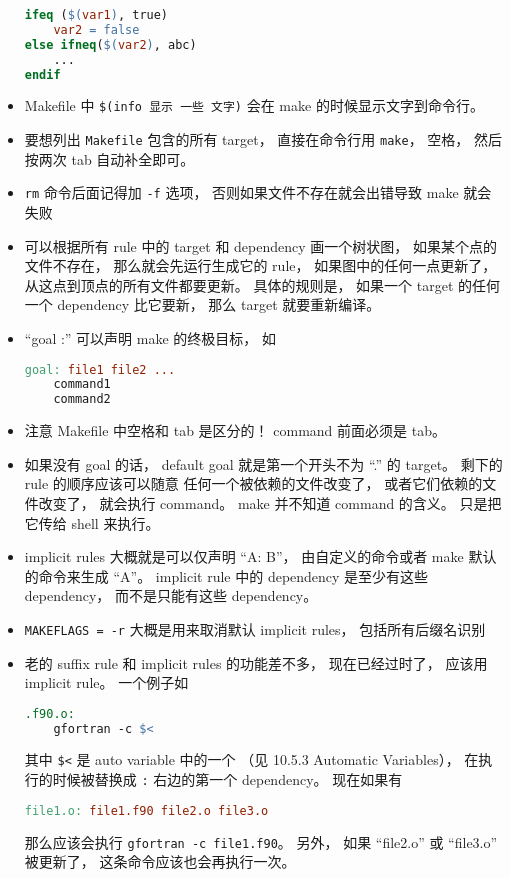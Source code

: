 \begin{itemize}
\begin{lstlisting}[language=makefile]
ifeq ($(var1), true)
    var2 = false
else ifneq($(var2), abc)
    ...
endif
\end{lstlisting}
\item Makefile 中 \verb|$(info 显示 一些 文字)| 会在 make 的时候显示文字到命令行。
\item 要想列出 \verb|Makefile| 包含的所有 target， 直接在命令行用 \verb|make|， 空格， 然后按两次 tab 自动补全即可。
\item \verb|rm| 命令后面记得加 \verb|-f| 选项， 否则如果文件不存在就会出错导致 make 就会失败
\item 可以根据所有 rule 中的 target 和 dependency 画一个树状图， 如果某个点的文件不存在， 那么就会先运行生成它的 rule， 如果图中的任何一点更新了， 从这点到顶点的所有文件都要更新。 具体的规则是， 如果一个 target 的任何一个 dependency 比它要新， 那么 target 就要重新编译。
\item “goal :” 可以声明 make 的终极目标， 如
\begin{lstlisting}[language=makefile]
goal: file1 file2 ...
	command1
	command2
\end{lstlisting}
\item 注意 Makefile 中空格和 tab 是区分的！ command 前面必须是 tab。
\item 如果没有 goal 的话， default goal 就是第一个开头不为 “.” 的 target。 剩下的 rule 的顺序应该可以随意
任何一个被依赖的文件改变了， 或者它们依赖的文件改变了， 就会执行 command。 make 并不知道 command 的含义。 只是把它传给 shell 来执行。
\item implicit rules 大概就是可以仅声明 “A: B”， 由自定义的命令或者 make 默认的命令来生成 “A”。 implicit rule 中的 dependency 是至少有这些 dependency， 而不是只能有这些 dependency。
\item \verb|MAKEFLAGS = -r| 大概是用来取消默认 implicit rules， 包括所有后缀名识别
\item 老的 suffix rule 和 implicit rules 的功能差不多， 现在已经过时了， 应该用 implicit rule。 一个例子如
\begin{lstlisting}[language=makefile]
.f90.o:
	gfortran -c $<
\end{lstlisting}
其中 \verb|$<| 是 auto variable 中的一个 （见 10.5.3 Automatic Variables）， 在执行的时候被替换成 \verb|:| 右边的第一个 dependency。 现在如果有
\begin{lstlisting}[language=makefile]
file1.o: file1.f90 file2.o file3.o
\end{lstlisting}
那么应该会执行 \verb|gfortran -c file1.f90|。 另外， 如果 “file2.o” 或 “file3.o” 被更新了， 这条命令应该也会再执行一次。

\end{itemize}
